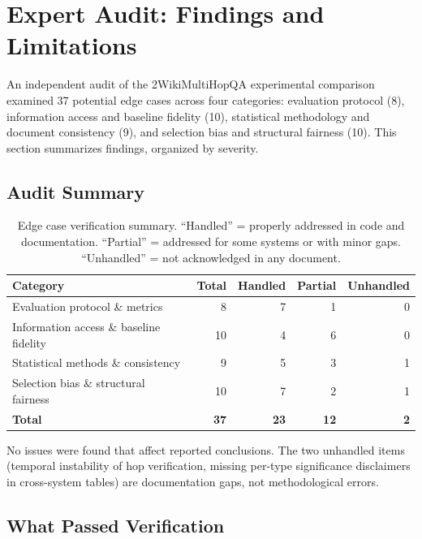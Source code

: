 \section{Expert Audit: Findings and Limitations}
\label{sec:expert-audit}

An independent audit of the 2WikiMultiHopQA experimental comparison examined 37 potential edge cases across four categories: evaluation protocol (8), information access and baseline fidelity (10), statistical methodology and document consistency (9), and selection bias and structural fairness (10). This section summarizes findings, organized by severity.

\subsection{Audit Summary}
\label{sec:audit-summary}

\begin{table}[h]
\centering
\begin{tabular}{lrrrr}
\toprule
\textbf{Category} & \textbf{Total} & \textbf{Handled} & \textbf{Partial} & \textbf{Unhandled} \\
\midrule
Evaluation protocol \& metrics & 8 & 7 & 1 & 0 \\
Information access \& baseline fidelity & 10 & 4 & 6 & 0 \\
Statistical methods \& consistency & 9 & 5 & 3 & 1 \\
Selection bias \& structural fairness & 10 & 7 & 2 & 1 \\
\midrule
\textbf{Total} & \textbf{37} & \textbf{23} & \textbf{12} & \textbf{2} \\
\bottomrule
\end{tabular}
\caption{Edge case verification summary. ``Handled'' = properly addressed in code and documentation. ``Partial'' = addressed for some systems or with minor gaps. ``Unhandled'' = not acknowledged in any document.}
\label{tab:audit-summary}
\end{table}

No issues were found that affect reported conclusions. The two unhandled items (temporal instability of hop verification, missing per-type significance disclaimers in cross-system tables) are documentation gaps, not methodological errors.

\subsection{What Passed Verification}
\label{sec:what-passed}

